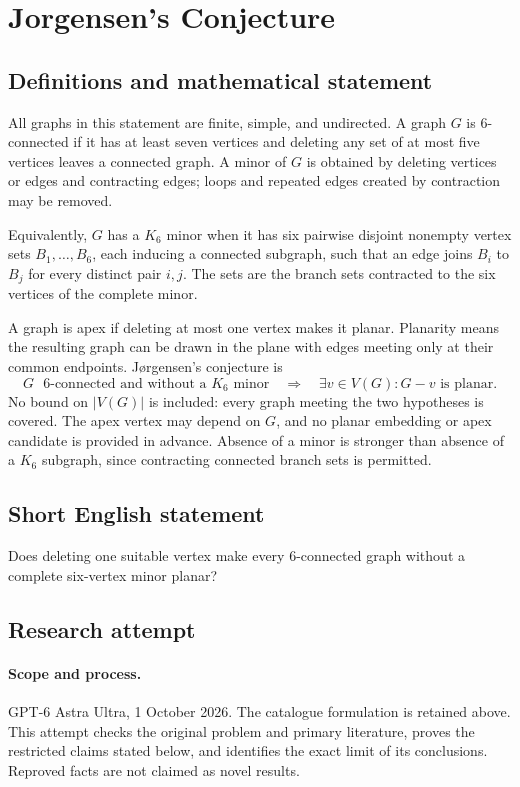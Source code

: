 \documentclass[11pt,a4paper]{article}
\begin{document}
\section*{Jorgensen's Conjecture}\label{statement}

\subsection{Definitions and mathematical statement}
All graphs in this statement are finite, simple, and
undirected. A graph $G$ is $6$-connected if it has at
least seven vertices and deleting any set of at most
five vertices leaves a connected graph. A minor of
$G$ is obtained by deleting vertices or edges and
contracting edges; loops and repeated edges created
by contraction may be removed.

Equivalently, $G$ has a $K_6$ minor when it has six
pairwise disjoint nonempty vertex sets
$B_1,\ldots,B_6$, each inducing a connected subgraph,
such that an edge joins $B_i$ to $B_j$ for every
distinct pair $i,j$. The sets are the branch sets
contracted to the six vertices of the complete minor.

A graph is apex if deleting at most one vertex makes
it planar. Planarity means the resulting graph can
be drawn in the plane with edges meeting only at
their common endpoints. Jørgensen's conjecture is
\[
 G\text{ $6$-connected and without a $K_6$ minor}
 \quad\Longrightarrow\quad
 \exists v\in V(G):G-v\text{ is planar}.
\]
No bound on $|V(G)|$ is included: every graph meeting
the two hypotheses is covered. The apex vertex may
depend on $G$, and no planar embedding or apex
candidate is provided in advance. Absence of a minor
is stronger than absence of a $K_6$ subgraph, since
contracting connected branch sets is permitted.
\subsection{Short English statement}
Does deleting one suitable vertex make every 6-connected graph without a complete six-vertex minor planar?
\subsection{Research attempt}
\paragraph{Scope and process.}
GPT-6 Astra Ultra, 1 October 2026. The catalogue formulation is retained above. This attempt checks the original problem and primary literature, proves the restricted claims stated below, and identifies the exact limit of its conclusions. Reproved facts are not claimed as novel results.
\end{document}
